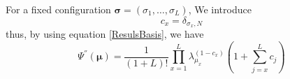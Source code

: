 \documentclass[10pt]{article}
\numberwithin{equation}{section}
\numberwithin{equation}{subsection}
\newcommand{\co}{\;,}
\newcommand{\dt}{\;.}
\begin{document}
\begin{comment}
{\color{blue}
	Old proposal
\begin{equation*}
	\begin{split}
		\Psi^{'}(\bm{\tau})&=\langle \bm{\tau}|(\mathcal{S}_{2}^{-1})^{\otimes L}|\Psi^{''}\rangle\\&= \Psi^{''}(\bm{\tau})+\sum_{q_{1}= 1}^{L}(1-\delta_{\tau_{q_{1}},N})\Psi^{''}(\varphi_{1}^{1},\ldots,\varphi_{L}^{1})\beta_{q_{1}^{1}}\\&+
		\sum_{q_{1},q_{2}= 1}^{L}(1-\delta_{\tau_{q_{1}},N})(1-\delta_{\tau_{q_{2}},N})\Psi^{''}(\varphi_{1}^{2},\ldots,\varphi_{L}^{2})\beta_{q_{1}}\beta_{q_{2}}\\&+\ldots+\Psi^{''}(N,\ldots,N)\left(\prod_{x=1}^{L}(1-\delta_{\tau_{x},N})\right)\prod_{x=1}^{L}\beta_{\tau_{x}}\dt%
	\end{split}
\end{equation*}}
{\color{blue}
	Other proposal
\begin{equation*}
	\begin{split}
		\Psi^{'}(\bm{\tau})&=\langle \bm{\tau}|(\mathcal{S}_{2}^{-1})^{\otimes L}|\Psi^{''}\rangle\\&= \Psi^{''}(\bm{\tau})+\sum_{q_{1}= 1}^{L}(1-\delta_{\tau_{q_{1}},N})\Psi^{''}(\tau_{1},\ldots,\tau_{q_{1}}=N,\ldots,\tau_{L})\beta_{q_{1}^{1}}\\&+
		\sum_{q_{1},q_{2}= 1}^{L}(1-\delta_{\tau_{q_{1}},N})(1-\delta_{\tau_{q_{2}},N})\Psi^{''}(\tau_{1},\ldots,\tau_{q_{1}}=N,\ldots,\tau_{q_{2}}=N,\ldots,\tau_{L})\beta_{q_{1}}\beta_{q_{2}}\\&+\ldots+\Psi^{''}(N,\ldots,N)\left(\prod_{x=1}^{L}(1-\delta_{\tau_{x},N})\right)\prod_{x=1}^{L}\beta_{\tau_{x}}\dt%
	\end{split}
\end{equation*}
}
\end{comment}
For a fixed configuration $\bm{\sigma}=(\sigma_{1},\ldots,\sigma_{L})$, 
We introduce 
\begin{equation}
	c_{x}=\delta_{\sigma_{x},N}
\end{equation}
thus, by using equation \eqref{ResulsBasis}, we have
\begin{equation}
	\Psi^{''}(\bm{\mu})=\frac{1}{\left(1+L\right)!}\prod_{x=1}^{L} \lambda_{\mu_{x}}^{(1-c_{x})}\left(1+\sum_{j=x}^{L}c_{j}\right)
\end{equation}
\begin{comment}
	\begin{equation}
		\Psi^{''}(\bm{\mu})=\frac{1}{\left(1+L\right)!}\prod_{x=1}^{L} \lambda_{\mu_{x}}^{(1-\delta_{\mu_{x},N})}\left(1+\sum_{j=x}^{L}\delta_{\mu_{j},N}\right)
	\end{equation}
\begin{equation}
	\Psi^{''}(\bm{\mu})=\frac{\Gamma(2+\sum_{x=1}^{L}\delta_{\mu_{x},N})}{\Gamma(L+2)}\prod_{x=1}^{L}\left(\lambda_{\mu_{x}}\left(2+L-x-\sum_{j=x}^{L}(1-\delta_{\mu_{j},N})\right)\right)^{1-\delta_{\mu_{x},N}}\co
\end{equation}
\end{comment}
\end{document}
